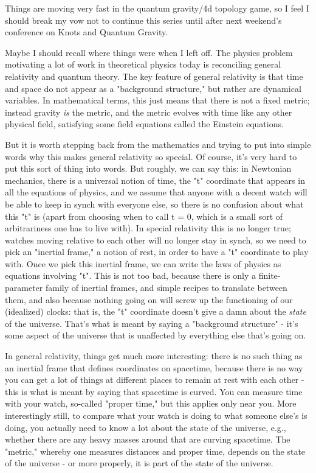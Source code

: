 

Things are moving very fast in the quantum gravity/4d topology game, so
I feel I should break my vow not to continue this series until after
next weekend's conference on Knots and Quantum Gravity.  

Maybe I should recall where things were when I left off.  The physics
problem motivating a lot of work in theoretical physics today is
reconciling general relativity and quantum theory.   The key feature of
general relativity is that time and space do not appear as a "background
structure," but rather are dynamical variables.  In mathematical terms,
this just means that there is not a fixed metric; instead gravity \emph{is}
the metric, and the metric evolves with time like any other physical
field, satisfying some field equations called the Einstein equations.  

But it is worth stepping back from the mathematics and trying to put
into simple words why this makes general relativity so special.  Of
course, it's very hard to put this sort of thing into words.  But
roughly, we can say this: in Newtonian mechanics, there is a universal
notion of time, the "t" coordinate that appears in all the equations of
physics, and we assume that anyone with a decent watch will be able to
keep in synch with everyone else, so there is no confusion about what
this "t" is (apart from choosing when to call t = 0, which is a small
sort of arbitrariness one has to live with).   In special relativity
this is no longer true; watches moving relative to each other will no
longer stay in synch, so we need to pick an "inertial frame," a notion
of rest, in order to have a "t" coordinate to play with.  Once we pick
this inertial frame, we can write the laws of physics as equations
involving "t".  This is not too bad, because there is only a
finite-parameter family of inertial frames, and simple recipes to
translate between them, and also because nothing going on will screw up
the functioning of our (idealized) clocks: that is, the "t" coordinate
doesn't give a damn about the \emph{state} of the universe.  That's what is
meant by saying a "background structure" - it's some aspect of the
universe that is unaffected by everything else that's going on.

In general relativity, things get much more interesting: there is no
such thing as an inertial frame that defines coordinates on spacetime,
because there is no way you can get a lot of things at different places
to remain at rest with each other - this is what is meant by saying that
spacetime is curved.  You can measure time with your watch, so-called
"proper time," but this applies only near you.  More interestingly
still, to compare what your watch is doing to what someone else's is
doing, you actually need to know a lot about the state of the universe,
e.g., whether there are any heavy masses around that are curving
spacetime.  The "metric," whereby one measures distances and proper
time, depends on the state of the universe - or more properly, it is
part of the state of the universe.  

